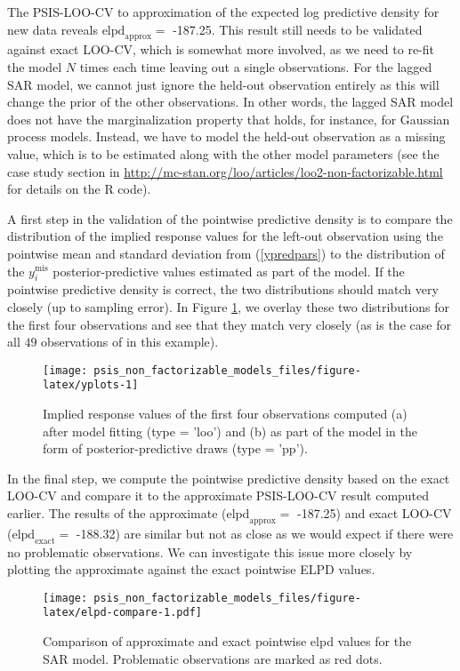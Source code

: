 \documentclass[english,,doc,floatsintext]{apa6}
\theoremstyle{definition}
\theoremstyle{definition}
\theoremstyle{definition}
\theoremstyle{remark}
\begin{document}
The PSIS-LOO-CV to approximation of the expected log predictive density
for new data reveals \(\text{elpd}_{\text{approx}} =\) -187.25. This
result still needs to be validated against exact LOO-CV, which is
somewhat more involved, as we need to re-fit the model \(N\) times each
time leaving out a single observations. For the lagged SAR model, we
cannot just ignore the held-out observation entirely as this will change
the prior of the other observations. In other words, the lagged SAR
model does not have the marginalization property that holds, for
instance, for Gaussian process models. Instead, we have to model the
held-out observation as a missing value, which is to be estimated along
with the other model parameters (see the case study section in
\url{http://mc-stan.org/loo/articles/loo2-non-factorizable.html} for
details on the R code).

A first step in the validation of the pointwise predictive density is to
compare the distribution of the implied response values for the left-out
observation using the pointwise mean and standard deviation from
(\ref{ypredpars}) to the distribution of the \(y_i^{\mathrm{mis}}\)
posterior-predictive values estimated as part of the model. If the
pointwise predictive density is correct, the two distributions should
match very closely (up to sampling error). In Figure \ref{fig:yplots},
we overlay these two distributions for the first four observations and
see that they match very closely (as is the case for all \(49\)
observations of in this example).

\begin{figure}
\texttt{[image: psis\_non\_factorizable\_models\_files/figure-latex/yplots-1]} \caption{Implied response values of the first four observations computed (a) after model fitting (type = 'loo') and (b) as part of the model in the form of posterior-predictive draws (type = 'pp').}\label{fig:yplots}
\end{figure}

In the final step, we compute the pointwise predictive density based on
the exact LOO-CV and compare it to the approximate PSIS-LOO-CV result
computed earlier. The results of the approximate
(\(\text{elpd}_{\text{approx}} =\) -187.25) and exact LOO-CV
(\(\text{elpd}_{\text{exact}} =\) -188.32) are similar but not as close
as we would expect if there were no problematic observations. We can
investigate this issue more closely by plotting the approximate against
the exact pointwise ELPD values.

\begin{figure}
\centering
\texttt{[image: psis\_non\_factorizable\_models\_files/figure-latex/elpd-compare-1.pdf]}
\caption{\label{fig:elpd-compare}Comparison of approximate and exact
pointwise elpd values for the SAR model. Problematic observations are
marked as red dots.}
\end{figure}
\end{document}
